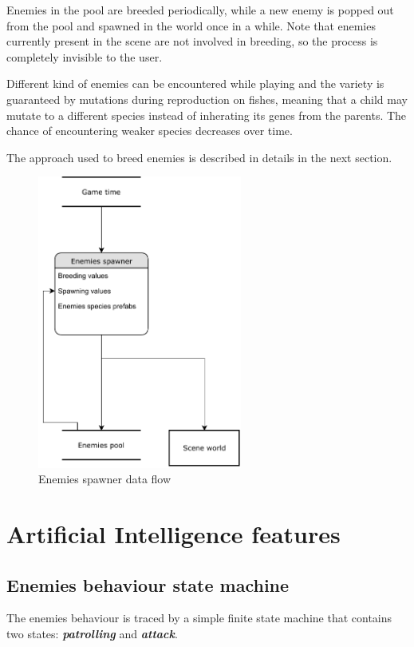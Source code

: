 \documentclass[11pt]{article}
\newcommand{\classname}[1]{\textit{\textbf{#1}}}
\begin{document}
Enemies in the pool are breeded periodically, while a new enemy is popped out from the pool and spawned in the world once in a while. Note that enemies currently present in the scene are not involved in breeding, so the process is completely invisible to the user.

Different kind of enemies can be encountered while playing and the variety is guaranteed by mutations during reproduction on fishes, meaning that a child may mutate to a different species instead of inherating its genes from the parents. The chance of encountering weaker species decreases over time.

The approach used to breed enemies is described in details in the next section.

\begin{figure}[H]
  \centering
  \includegraphics[width=0.6\textwidth]{figures/enemies_spawner}
  \caption{Enemies spawner data flow}
\end{figure}

\section{Artificial Intelligence features}
\subsection{Enemies behaviour state machine}
The enemies behaviour is traced by a simple finite state machine that contains two states: \classname{patrolling} and \classname{attack}.
\end{document}
